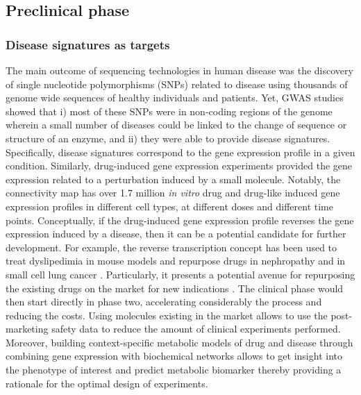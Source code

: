 \subsection{Preclinical phase}
\subsubsection{Disease signatures as targets}
The main outcome of sequencing technologies in human disease was the discovery of single nucleotide polymorphisms (SNPs) related to disease using thousands of genome wide sequences of healthy individuals and patients. Yet, GWAS studies showed that i) most of these SNPs were in non-coding regions of the genome wherein a small number of diseases could be linked to the change of sequence or structure of an enzyme, and ii) they were able to provide disease signatures. Specifically, disease signatures correspond to the gene expression profile in a given condition. Similarly, drug-induced gene expression experiments provided the gene expression related to a perturbation induced by a small molecule. Notably, the connectivity map \cite{lamb2006connectivity,subramanian2017next} has over 1.7 million \textit{in vitro} drug and drug-like induced gene expression profiles in different cell types, at different doses and different time points. Conceptually, if the drug-induced gene expression profile reverses the gene expression induced by a disease, then it can be a potential candidate for further development. For example, the reverse transcription concept has been used to treat dyslipedimia in mouse models \cite{wagner2015drugs} and repurpose drugs in nephropathy \cite{zhong2013renoprotective} and in small cell lung cancer \cite{jahchan2013drug}. Particularly, it presents a potential avenue for repurposing the existing drugs on the market for new indications \cite{dudley2011exploiting}. The clinical phase would then start directly in phase two, accelerating considerably the process and reducing the costs. Using molecules existing in the market allows to use the post-marketing safety data to reduce the amount of clinical experiments performed.
Moreover, building context-specific metabolic models of drug and disease through combining gene expression with biochemical networks allows to get insight into the phenotype of interest and predict metabolic biomarker thereby providing a rationale for the optimal design of experiments. 
